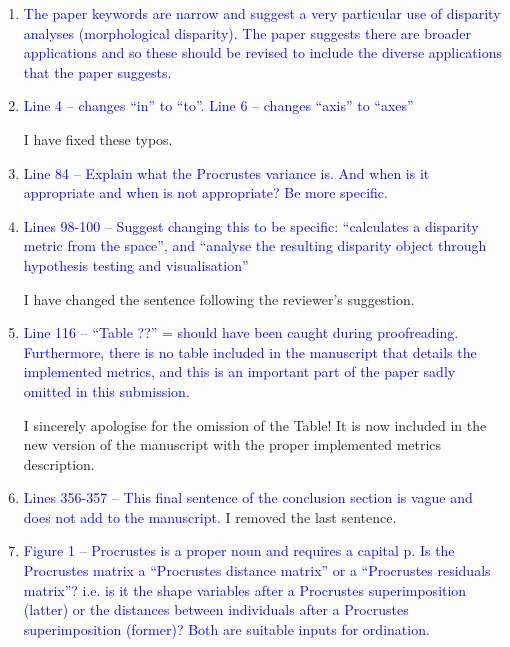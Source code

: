 \documentclass[12pt,letterpaper]{article}
\begin{document}
\begin{enumerate}

\item{\textcolor{blue}{The paper keywords are narrow and suggest a very particular use of disparity analyses (morphological disparity). The paper suggests there are broader applications and so these should be revised to include the diverse applications that the paper suggests. }}


\item{\textcolor{blue}{Line 4 – changes ``in'' to ``to''. Line 6 – changes ``axis'' to ``axes''}}
\label{abstract_typo}

I have fixed these typos.

\item{\textcolor{blue}{Line 84 – Explain what the Procrustes variance is. And when is it appropriate and when is not appropriate? Be more specific.}}


\item{\textcolor{blue}{Lines 98-100 – Suggest changing this to be specific: “calculates a disparity metric from the space”, and “analyse the resulting disparity object through hypothesis testing and visualisation”}}

I have changed the sentence following the reviewer's suggestion.

\item{\textcolor{blue}{Line 116 – “Table ??” = should have been caught during proofreading. Furthermore, there is no table included in the manuscript that details the implemented metrics, and this is an important part of the paper sadly omitted in this submission.}}
\label{table_missing}

I sincerely apologise for the omission of the Table! It is now included in the new version of the manuscript with the proper implemented metrics description.

\item{\textcolor{blue}{Lines 356-357 – This final sentence of the conclusion section is vague and does not add to the manuscript.}}
\label{remove_last_sentence}
I removed the last sentence.

\item{\textcolor{blue}{Figure 1 – Procrustes is a proper noun and requires a capital p. Is the Procrustes matrix a “Procrustes distance matrix” or a “Procrustes residuals matrix”? i.e. is it the shape variables after a Procrustes superimposition (latter) or the distances between individuals after a Procrustes superimposition (former)? Both are suitable inputs for ordination.}}


\end{enumerate}
\end{document}
